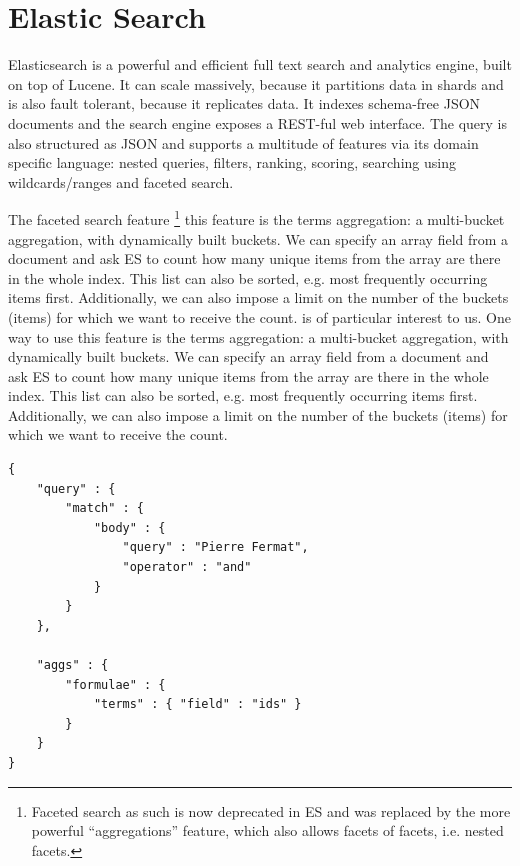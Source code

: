 \documentclass{deliverablereport}
\begin{document}
\section{Elastic Search}\label{sec:elastic}
Elasticsearch is a powerful and efficient full text search and analytics engine, built on top of Lucene. It can scale massively, because it partitions data in shards and is also fault tolerant, because it replicates data. It indexes schema-free JSON documents and the search engine exposes a REST-ful web interface. The query is also structured as JSON and supports a multitude of features via its domain specific language: nested queries, filters, ranking, scoring, searching using wildcards/ranges and faceted search. \par

The faceted search feature \footnote{Faceted search as such is now deprecated in ES and was replaced by the more powerful “aggregations” feature, which also allows facets of facets, i.e. nested facets.} this feature is the terms aggregation: a multi-bucket aggregation, with dynamically built buckets. We can specify an array field from a document and ask ES to count how many unique items from the array are there in the whole index. This list can also be sorted, e.g. most frequently occurring items first. Additionally, we can also impose a limit on the number of the buckets (items) for which we want to receive the count. is of particular interest to us. One way to use this feature is the terms aggregation: a multi-bucket aggregation, with dynamically built buckets. We can specify an array field from a document and ask ES to count how many unique items from the array are there in the whole index. This list can also be sorted, e.g. most frequently occurring items first. Additionally, we can also impose a limit on the number of the buckets (items) for which we want to receive the count. \par

\vspace{5mm}


\begin{lstlisting}[caption={Elastic Search Term Aggregation Query}]
{
	"query" : {
		"match" : {
			"body" : {
				"query" : "Pierre Fermat",
				"operator" : "and"
			}
		}
	},

	"aggs" : {
		"formulae" : {
			"terms" : { "field" : "ids" }
		}
	}
}

\end{lstlisting}

\vspace{5mm}
\end{document}
